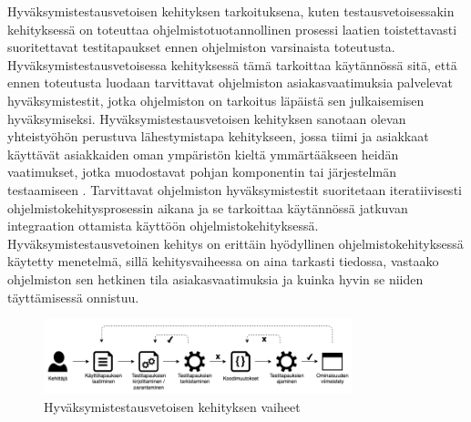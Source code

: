   Hyväksymistestausvetoisen kehityksen tarkoituksena, kuten testausvetoisessakin kehityksessä on toteuttaa ohjelmistotuotannollinen prosessi laatien toistettavasti suoritettavat testitapaukset ennen ohjelmiston varsinaista toteutusta.
  Hyväksymistestausvetoisessa kehityksessä tämä tarkoittaa käytännössä sitä, että ennen toteutusta luodaan tarvittavat ohjelmiston asiakasvaatimuksia palvelevat hyväksymistestit, jotka ohjelmiston on tarkoitus läpäistä sen julkaisemisen hyväksymiseksi.
  Hyväksymistestausvetoisen kehityksen sanotaan olevan yhteistyöhön perustuva lähestymistapa kehitykseen, jossa tiimi ja asiakkaat käyttävät asiakkaiden oman ympäristön kieltä ymmärtääkseen heidän vaatimukset, jotka muodostavat pohjan komponentin tai järjestelmän testaamiseen \parencite{istqb_acceptance_testing_2}.
  Tarvittavat ohjelmiston hyväksymistestit suoritetaan iteratiivisesti ohjelmistokehitysprosessin aikana ja se tarkoittaa käytännössä jatkuvan integraation ottamista käyttöön ohjelmistokehityksessä.
  Hyväksymistestausvetoinen kehitys on erittäin hyödyllinen ohjelmistokehityksessä käytetty menetelmä, sillä kehitysvaiheessa on aina tarkasti tiedossa, vastaako ohjelmiston sen hetkinen tila asiakasvaatimuksia ja kuinka hyvin se niiden täyttämisessä onnistuu.

  \begin{figure}[H]
    \centering
    \includegraphics[width=0.8\textwidth]{assets/hyvaksymistestausvetoinen-kehitys.png}
    \caption{Hyväksymistestausvetoisen kehityksen vaiheet}
    \label{fig:hyvaksymistestausvetoinen-kehitys}
  \end{figure}

